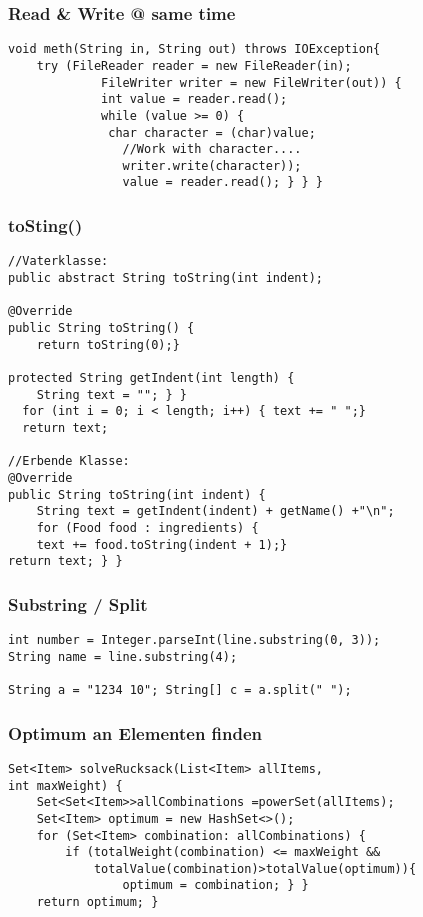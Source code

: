 \begin{multicols*}{5}
	\subsubsection{Read \& Write @ same time}
		\begin{lstlisting}
void meth(String in, String out) throws IOException{ 
	try (FileReader reader = new FileReader(in);
			 FileWriter writer = new FileWriter(out)) { 
			 int value = reader.read();
			 while (value >= 0) {
			  char character = (char)value; 
			  	//Work with character....
				writer.write(character));
			 	value = reader.read(); } } }
		\end{lstlisting}
	\subsubsection{toSting()}
		\begin{lstlisting}
//Vaterklasse:
public abstract String toString(int indent);			

@Override
public String toString() {
	return toString(0);}

protected String getIndent(int length) { 
	String text = ""; } }
  for (int i = 0; i < length; i++) { text += " ";}
  return text;

//Erbende Klasse:
@Override
public String toString(int indent) {
	String text = getIndent(indent) + getName() +"\n";
	for (Food food : ingredients) {
	text += food.toString(indent + 1);}
return text; } }
		\end{lstlisting}
	\subsubsection{Substring / Split}
		\begin{lstlisting}
int number = Integer.parseInt(line.substring(0, 3));
String name = line.substring(4);

String a = "1234 10"; String[] c = a.split(" ");
		\end{lstlisting}

	\subsubsection{Optimum an Elementen finden}	
		\begin{lstlisting}
Set<Item> solveRucksack(List<Item> allItems, 
int maxWeight) { 
	Set<Set<Item>>allCombinations =powerSet(allItems); 
	Set<Item> optimum = new HashSet<>();
	for (Set<Item> combination: allCombinations) {
		if (totalWeight(combination) <= maxWeight && 
			totalValue(combination)>totalValue(optimum)){
				optimum = combination; } } 
	return optimum; }


\end{lstlisting}
\end{multicols*}
